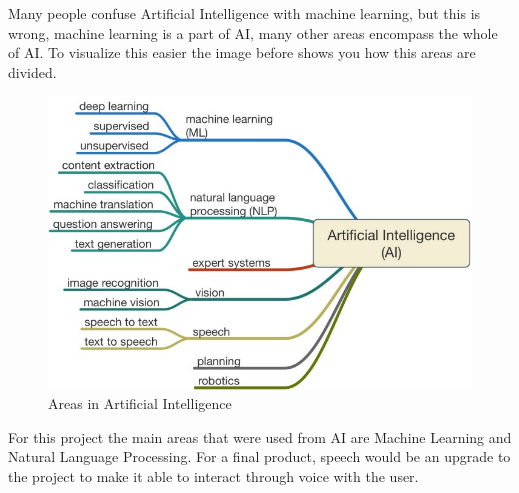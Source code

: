 Many people confuse Artificial Intelligence with machine learning, but this is wrong, machine learning is a part of AI, many other areas encompass the whole of AI. To visualize this easier the image before shows you how 	this areas are divided.\cite{ai}\\

\begin{center}
	\begin{figure}[h!]
		\centering
		\includegraphics[scale=0.5]{./images/3-ai-areas}
		\caption{Areas in Artificial Intelligence}
		\label{ai-areas}
	\end{figure}
\end{center}

For this project the main areas that were used from AI are Machine Learning and Natural Language Processing. For a final product, speech would be an upgrade to the project to make it able to interact through voice with the user.\\

